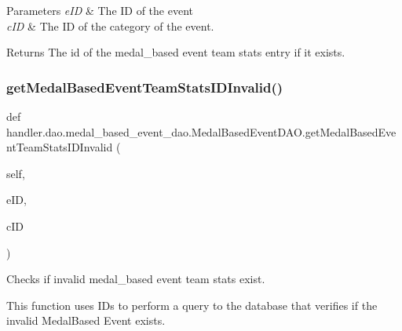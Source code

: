 \begin{DoxyParams}{Parameters}
{\em e\+ID} & The ID of the event \\
\hline
{\em c\+ID} & The ID of the category of the event.\\
\hline
\end{DoxyParams}
\begin{DoxyReturn}{Returns}
The id of the medal\+\_\+based event team stats entry if it exists. 
\end{DoxyReturn}
\mbox{\label{classhandler_1_1dao_1_1medal__based__event__dao_1_1_medal_based_event_d_a_o_a975bd0678f1ef745008c109f0bbc906c}} 
\subsubsection{\texorpdfstring{get\+Medal\+Based\+Event\+Team\+Stats\+I\+D\+Invalid()}{getMedalBasedEventTeamStatsIDInvalid()}}
{\footnotesize\ttfamily def handler.\+dao.\+medal\+\_\+based\+\_\+event\+\_\+dao.\+Medal\+Based\+Event\+D\+A\+O.\+get\+Medal\+Based\+Event\+Team\+Stats\+I\+D\+Invalid (\begin{DoxyParamCaption}\item[{}]{self,  }\item[{}]{e\+ID,  }\item[{}]{c\+ID }\end{DoxyParamCaption})}



Checks if invalid medal\+\_\+based event team stats exist. 

This function uses I\+Ds to perform a query to the database that verifies if the invalid Medal\+Based Event exists.


